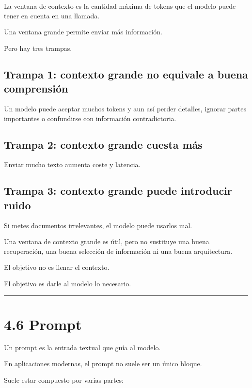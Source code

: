 La ventana de contexto es la cantidad máxima de tokens que el modelo
puede tener en cuenta en una llamada.

Una ventana grande permite enviar más información.

Pero hay tres trampas.

\subsection{Trampa 1: contexto grande no equivale a buena
comprensión}\label{trampa-1-contexto-grande-no-equivale-a-buena-comprensiuxf3n}

Un modelo puede aceptar muchos tokens y aun así perder detalles, ignorar
partes importantes o confundirse con información contradictoria.

\subsection{Trampa 2: contexto grande cuesta
más}\label{trampa-2-contexto-grande-cuesta-muxe1s}

Enviar mucho texto aumenta coste y latencia.

\subsection{Trampa 3: contexto grande puede introducir
ruido}\label{trampa-3-contexto-grande-puede-introducir-ruido}

Si metes documentos irrelevantes, el modelo puede usarlos mal.

Una ventana de contexto grande es útil, pero no sustituye una buena
recuperación, una buena selección de información ni una buena
arquitectura.

El objetivo no es llenar el contexto.

El objetivo es darle al modelo lo necesario.

\begin{center}\rule{0.5\linewidth}{0.5pt}\end{center}

\section{4.6 Prompt}\label{prompt}

Un prompt es la entrada textual que guía al modelo.

En aplicaciones modernas, el prompt no suele ser un único bloque.

Suele estar compuesto por varias partes:

